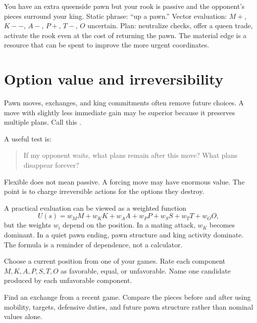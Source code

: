 \begin{workedbox}[title={Worked example: a pawn is not a plan}]
You have an extra queenside pawn but your rook is passive and the opponent's pieces surround your king. Static phrase: ``up a pawn.'' Vector evaluation: $M+$, $K--$, $A-$, $P+$, $T-$, $O$ uncertain. Plan: neutralize checks, offer a queen trade, activate the rook even at the cost of returning the pawn. The material edge is a resource that can be spent to improve the more urgent coordinates.
\end{workedbox}

\section{Option value and irreversibility}
Pawn moves, exchanges, and king commitments often remove future choices. A move with slightly less immediate gain may be superior because it preserves multiple plans. Call this .

A useful test is:

\begin{quote}
If my opponent waits, what plans remain after this move? What plans disappear forever?
\end{quote}

Flexible does not mean passive. A forcing move may have enormous value. The point is to charge irreversible actions for the options they destroy.

\begin{formalbox}
A practical evaluation can be viewed as a weighted function
\[
U(s)=w_M M+w_K K+w_A A+w_P P+w_S S+w_T T+w_O O,
\]
but the weights $w_i$ depend on the position. In a mating attack, $w_K$ becomes dominant. In a quiet pawn ending, pawn structure and king activity dominate. The formula is a reminder of dependence, not a calculator.
\end{formalbox}

\begin{exercise}
Choose a current position from one of your games. Rate each component $M,K,A,P,S,T,O$ as favorable, equal, or unfavorable. Name one candidate produced by each unfavorable component.
\end{exercise}

\begin{exercise}
Find an exchange from a recent game. Compare the pieces before and after using mobility, targets, defensive duties, and future pawn structure rather than nominal values alone.
\end{exercise}

